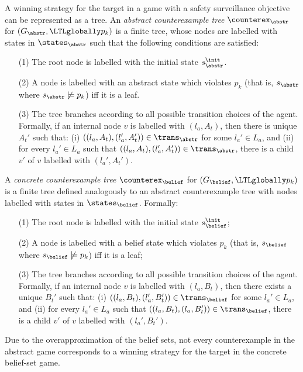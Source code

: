 A winning strategy for the target in a game with a safety surveillance objective can be represented as a tree. 
An \emph{abstract counterexample tree} $\counterex_\abstr$ for $(G_\abstr,\LTLglobally p_k)$ is a finite tree,  whose nodes are labelled with states in $\states_\abstr$ such that the following conditions are satisfied:
\begin{itemize}
\item[(1)] The root node is labelled with the initial state $s_\abstr^\init$.
\item[(2)] A node is labelled with an abstract state  which violates $p_k$ (that is, $s_\abstr$ where $s_\abstr \not\models p_k$) iff it is a leaf.
\item[(3)] The tree branches according to all possible transition choices of the agent. Formally, if an internal node $v$ is labelled with $(l_a,A_t)$, then there is unique $A_t'$  such that: (i) $((l_a,A_t),(l_a',A_t')) \in \trans_\abstr$ for some $l_a' \in L_a$, and (ii) for every $l_a' \in L_a$ such that $((l_a,A_t),(l_a',A_t')) \in \trans_\abstr$, there is a child $v'$ of $v$ labelled with $(l_a',A_t')$.
\end{itemize}


A \emph{concrete counterexample tree} $\counterex_\belief$ for $(G_\belief,\LTLglobally p_k)$ is a finite tree defined analogously to an abstract counterexample tree with nodes labelled with states in $\states_\belief$. Formally: 
\begin{itemize}
\item[(1)] The root node is labelled with the initial state $s_\belief^\init$;
\item[(2)] A node is labelled with a belief state which violates $p_k$ (that is, $s_\belief$ where $s_\belief \not\models p_k$) iff it is a leaf;
\item[(3)] The tree branches according to all possible transition choices of the agent. Formally, if an internal node $v$ is labelled with $(l_a,B_t)$, then there exists a unique $B_t'$  such that: (i) $((l_a,B_t),(l_a',B_t')) \in \trans_\belief$ for some $l_a' \in L_a$, and (ii) for every $l_a' \in L_a$ such that $((l_a,B_t),(l_a,B_t')) \in \trans_\belief$, there is a child $v'$ of $v$ labelled with $(l_a',B_t')$.
\end{itemize}

\bigskip

Due to the overapproximation of the belief sets, not every counterexample in the abstract game corresponds to a winning strategy for the target in the concrete belief-set game.

